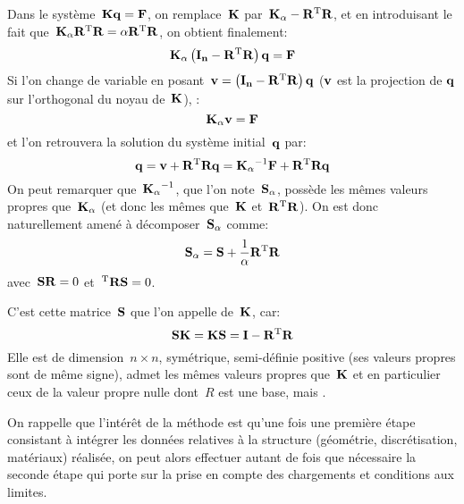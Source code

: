 Dans le système~$\MM{K}\VV{q}=\VV{F}$, on remplace~$\MM{K}$ par~$\MM{K_\alpha}-\MM{R}\MMT{R}$, et en introduisant le
fait que~$\MM{K_\alpha}\MM{R}\MMT{R}=\alpha \MM{R}\MMT{R}$, on obtient finalement:
\begin{equation}
\MM{K_\alpha} \left(\MM{I_n}-\MM{R}\MMT{R}\right)\VV{q}=\VV{F}
\end{equation}
Si l'on change de variable en posant~$\VV{v}=\left(\MM{I_n}-\MM{R}\MMT{R}\right)\VV{q}$ ($\VV{v}$ est la projection de
$\VV{q}$ sur l'orthogonal du noyau de~$\MM{K}$), :
\begin{equation}
\MM{K_\alpha}\VV{v}=\VV{F}
\end{equation}
et l'on retrouvera la solution du système initial~$\VV{q}$ par:
\begin{equation}\VV{q}=\VV{v}+\MM{R}\MMT{R}\VV{q} = \MMI{K_\alpha}\VV{F}+\MM{R}\MMT{R}\VV{q}\end{equation}
\medskip
On peut remarquer que~$\MMI{K_\alpha}$, que l'on note~$\MM{S_\alpha}$, possède les mêmes valeurs propres que~$\MM{K_\alpha}$ (et donc les mêmes que~$\MM{K}$ et~$\MM{R}\MMT{R}$). On est donc naturellement amené à décomposer~$\MM{S_\alpha}$ comme:
\begin{equation} \MM{S_\alpha}=\MM{S}+\frac1\alpha \MM{R}\MMT{R}\end{equation}
avec~$\MM{S}\MM{R}=0$ et~$\MMT{R}\MM{S}=0$.

C'est cette matrice~$\MM{S}$ que l'on appelle  de~$\MM{K}$, car:
\begin{equation} \MM{S}\MM{K} = \MM{K}\MM{S} = \MM{I} -\MM{R}\MMT{R}\end{equation}
Elle est de dimension~$n\times n$, symétrique, semi-définie positive (ses valeurs propres sont de même signe), admet les mêmes valeurs propres que~$\MM{K}$ et en particulier ceux de la valeur propre nulle dont~$R$ est une base, mais .

\bigskip
{}

\medskip
On rappelle que l'intérêt de la méthode est qu'une fois une première étape consistant à intégrer les données relatives à la structure (géométrie, discrétisation, matériaux) réalisée, on peut alors effectuer autant de fois que nécessaire la seconde étape qui porte sur la prise en compte des chargements et conditions aux limites.

